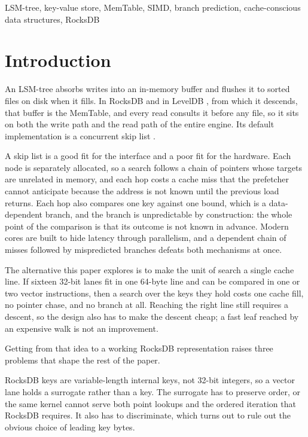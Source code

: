 \documentclass[conference]{IEEEtran}
\begin{document}
\begin{IEEEkeywords}
LSM-tree, key-value store, MemTable, SIMD, branch prediction, cache-conscious
data structures, RocksDB
\end{IEEEkeywords}

\section{Introduction}

An LSM-tree \cite{oneil1996lsm,luo2020survey} absorbs writes into an in-memory
buffer and flushes it to sorted files on disk when it fills. In RocksDB
\cite{dong2021rocksdb,dong2017space,rocksdb} and in LevelDB \cite{leveldb},
from which it descends, that buffer is the MemTable, and every read
consults it before any file, so it sits on both the write path and the read path
of the entire engine. Its default implementation is a concurrent skip list
\cite{pugh1990skip}.

A skip list is a good fit for the interface and a poor fit for the hardware. Each
node is separately allocated, so a search follows a chain of pointers whose
targets are unrelated in memory, and each hop costs a cache miss that the
prefetcher cannot anticipate because the address is not known until the previous
load returns. Each hop also compares one key against one bound, which is a
data-dependent branch, and the branch is unpredictable by construction: the whole
point of the comparison is that its outcome is not known in advance. Modern cores
are built to hide latency through parallelism, and a dependent chain of misses
followed by mispredicted branches defeats both mechanisms at once.

The alternative this paper explores is to make the unit of search a single cache
line. If sixteen 32-bit lanes fit in one 64-byte line and can be compared in one or
two vector instructions, then a search over the keys they hold costs one cache fill,
no pointer chase, and no branch at all. Reaching the right line still requires a
descent, so the design also has to make the descent cheap; a fast leaf reached by
an expensive walk is not an improvement.

Getting from that idea to a working RocksDB representation raises three problems
that shape the rest of the paper.

RocksDB keys are variable-length internal keys, not 32-bit integers, so a vector
lane holds a surrogate rather than a key. The surrogate has to preserve order, or
the same kernel cannot serve both point lookups and the ordered iteration that
RocksDB requires. It also has to discriminate, which turns out to rule out the
obvious choice of leading key bytes.
\end{document}
